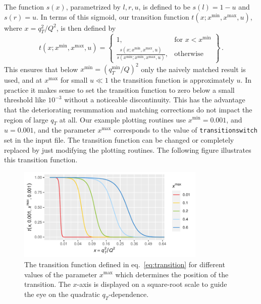 The function $s(x)$, parametrized by $l,r,u$, is defined to be $s(l)=1-u$ and $s(r)=u$.
In terms of this sigmoid, our transition function $t(x; x^{\text{min}},x^{\text{max}},u)$, where 
$x=q_T^2/Q^2$, is then defined by
\begin{equation}\label{eq:transition}
	t(x; x^{\text{min}},x^{\text{max}},u) = \left\{\begin{array}{lr}
		1 , & \text{for } x < x^{\text{min}}\\
		\frac{s(x; x^{\text{min}}, x^{\text{max}},u)}
		     {s(x^{\text{min}}; x^{\text{min}}, x^{\text{max}},u)}, & 
		\text{otherwise}
	\end{array}\right\}\,.
\end{equation}
This ensures that below $x^{\text{min}}=(q_T^{\text{min}}/Q)^2$ only the naively matched result is 
used, and at
$x^{\text{max}}$
for small $u\ll1$ the transition function is approximately $u$. In practice it makes sense to set 
the transition
function to zero below a small threshold like $10^{-3}$ without a noticeable discontinuity.
This has the advantage that the deteriorating resummation and matching corrections do not impact 
the region of 
large $q_T$ at all.
Our example plotting routines use $x^{\text{min}}=0.001$, and $u=0.001$, and the parameter 
$x^{\text{max}}$ corresponds to the value of \texttt{transitionswitch} set in the input file. The 
transition function can be changed or completely replaced by just modifying the plotting routines. 
The following figure illustrates this transition function.

\begin{figure}[t!]
	\centering
	\includegraphics[width=0.8\textwidth]{transition.pdf}
	\caption{The transition function defined in eq.~\eqref{eq:transition} for different values of 
	the parameter $x^{\text{max}}$ which determines the position of the 
		transition. The $x$-axis is displayed on a square-root scale 
		to guide the eye on 
		the quadratic $q_T$-dependence.}
	\label{fig:transition}
\end{figure}
